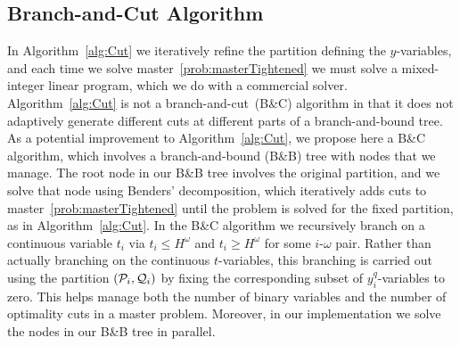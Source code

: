 \documentclass[11pt]{article}
\newcommand{\cQ}{{\cal Q}}
\newcommand{\cP}{{\cal P}}
\begin{document}
	\subsection{Branch-and-Cut Algorithm}\label{subsec:bbpartition}
	In Algorithm~\ref{alg:Cut} we iteratively refine the partition defining the $y$-variables, and each time we solve master~\eqref{prob:masterTightened} we must solve a mixed-integer linear program, which we do with a commercial solver.
	Algorithm~\ref{alg:Cut} is not a branch-and-cut~(B\&C) algorithm in that it does not adaptively generate different cuts at different parts of a branch-and-bound tree. As a potential improvement to Algorithm~\ref{alg:Cut}, we propose here a B\&C algorithm, which involves a branch-and-bound (B\&B) tree with nodes that we manage. The root node in our B\&B tree involves the original partition, and we solve that node using Benders' decomposition, which iteratively adds cuts to master~\eqref{prob:masterTightened} until the problem is solved for the fixed partition, as in Algorithm~\ref{alg:Cut}. In the B\&C algorithm we recursively branch on a continuous variable $t_i$ via $t_i \le H^\omega$ and $t_i \ge H^\omega$ for some $i$-$\omega$ pair. Rather than actually branching on the continuous $t$-variables, this branching is carried out using the partition $(\cP_i,\cQ_i)$ by fixing the corresponding subset of $y_i^q$-variables to zero. This helps manage both the number of binary variables and the number of optimality cuts in a master problem. Moreover, in our implementation we solve the nodes in our B\&B tree in parallel.  
\end{document}
